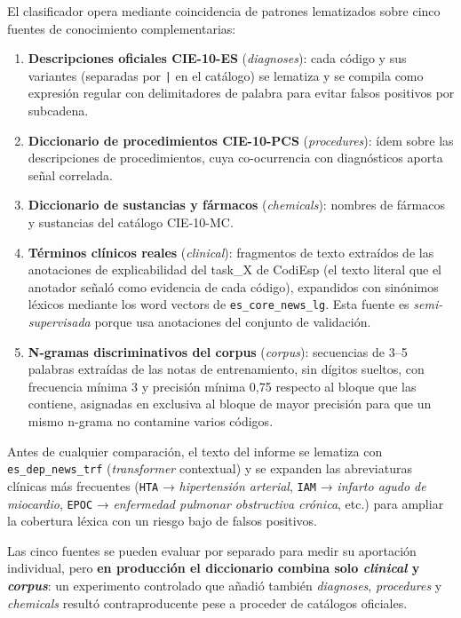 El clasificador opera mediante coincidencia de patrones lematizados sobre cinco fuentes de conocimiento complementarias:

\begin{enumerate}
 \item \textbf{Descripciones oficiales CIE-10-ES} (\emph{diagnoses}): cada código y sus variantes (separadas por \texttt{|} en el catálogo) se lematiza y se compila como expresión regular con delimitadores de palabra para evitar falsos positivos por subcadena.
 \item \textbf{Diccionario de procedimientos CIE-10-PCS} (\emph{procedures}): ídem sobre las descripciones de procedimientos, cuya co-ocurrencia con diagnósticos aporta señal correlada.
 \item \textbf{Diccionario de sustancias y fármacos} (\emph{chemicals}): nombres de fármacos y sustancias del catálogo CIE-10-MC.
 \item \textbf{Términos clínicos reales} (\emph{clinical}): fragmentos de texto extraídos de las anotaciones de explicabilidad del task\_X de CodiEsp (el texto literal que el anotador señaló como evidencia de cada código), expandidos con sinónimos léxicos mediante los word vectors de \texttt{es\_core\_news\_lg}. Esta fuente es \emph{semi-supervisada} porque usa anotaciones del conjunto de validación.
 \item \textbf{N-gramas discriminativos del corpus} (\emph{corpus}): secuencias de 3--5 palabras extraídas de las notas de entrenamiento, sin dígitos sueltos, con frecuencia mínima 3 y precisión mínima 0,75 respecto al bloque que las contiene, asignadas en exclusiva al bloque de mayor precisión para que un mismo n-grama no contamine varios códigos.
\end{enumerate}

Antes de cualquier comparación, el texto del informe se lematiza con \texttt{es\_dep\_news\_trf} (\emph{transformer} contextual) y se expanden las abreviaturas clínicas más frecuentes (\texttt{HTA} → \emph{hipertensión arterial}, \texttt{IAM} → \emph{infarto agudo de miocardio}, \texttt{EPOC} → \emph{enfermedad pulmonar obstructiva crónica}, etc.) para ampliar la cobertura léxica con un riesgo bajo de falsos positivos.

Las cinco fuentes se pueden evaluar por separado para medir su aportación individual, pero \textbf{en producción el diccionario combina solo \emph{clinical} y \emph{corpus}}: un experimento controlado que añadió también \emph{diagnoses}, \emph{procedures} y \emph{chemicals} resultó contraproducente pese a proceder de catálogos oficiales.

